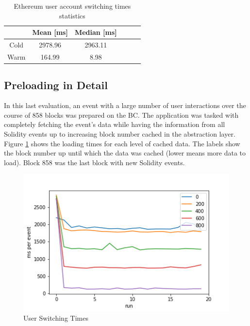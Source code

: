 \begin{table}[ht]
\centering
\begin{tabular}{|c|c|c|c|c|c|}
\hline
 & \textbf{Mean [ms]} & \textbf{Median [ms]} \\ \hline
Cold & 2978.96            & 2963.11     \\ \hline
Warm & 164.99           &  8.98      \\ \hline
\end{tabular}
\caption{Ethereum user account switching times statistics}
\label{tab:baseline1}
\end{table}


\subsection{Preloading in Detail}\label{section:eval-preloading}


In this last evaluation, an event with a large number of user interactions over the course of 858 blocks was prepared on the BC. The application was tasked with completely fetching the event's data while having the information from all Solidity events up to increasing block number cached in the abstraction layer. Figure \ref{img:caching} shows the loading times for each level of cached data. The labels show the block number up until which the data was cached (lower means more data to load). Block 858 was the last block with new Solidity events. 

\begin{figure}[H]
    \centering
    \includegraphics[width=14cm]{images/plot4.png}
    \caption{User Switching Times \protect\footnotemark}
    \label{img:caching}
\end{figure}

